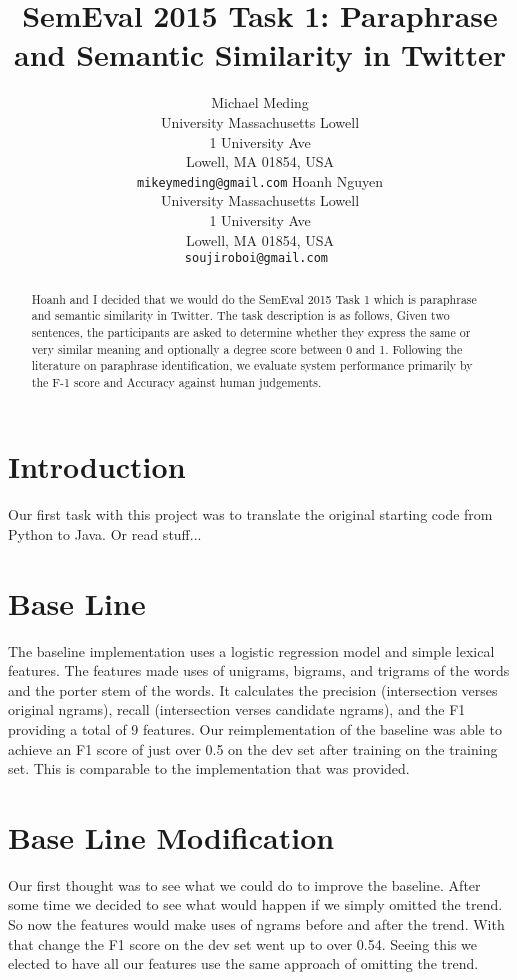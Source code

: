 \documentclass[11pt,letterpaper]{article}
\title{SemEval 2015 Task 1: Paraphrase and Semantic Similarity in Twitter}
\author{
	Michael Meding\\
  	University Massachusetts Lowell\\
	1 University Ave\\
	Lowell, MA 01854, USA\\
   {\tt mikeymeding@gmail.com}
	\And  
   Hoanh Nguyen\\
	University Massachusetts Lowell\\
	1 University Ave\\
	Lowell, MA 01854, USA\\
	{\tt soujiroboi@gmail.com }
}
\date{}
\begin{document}
\maketitle
\begin{abstract}
Hoanh and I decided that we would do the SemEval 2015 Task 1 which is paraphrase and semantic similarity in Twitter. The task description is as follows, Given two sentences, the participants are asked to determine whether they express the same or very similar meaning and optionally a degree score between 0 and 1. Following the literature on paraphrase identification, we evaluate system performance primarily by the F-1 score and Accuracy against human judgements. 
\end{abstract}

\section{Introduction}
\paragraph{} 
Our first task with this project was to translate the original starting code from Python to Java. Or read stuff...

\section{Base Line}
The baseline implementation uses a logistic regression model and simple lexical features. The features made uses of unigrams, bigrams, and trigrams of the words and the porter stem of the words. It calculates the precision (intersection verses original ngrams), recall (intersection verses candidate ngrams), and the F1 providing a total of 9 features. Our reimplementation of the baseline was able to achieve an F1 score of just over 0.5 on the dev set after training on the training set. This is comparable to the implementation that was provided.

\section{Base Line Modification}
Our first thought was to see what we could do to improve the baseline. After some time we decided to see what would happen if we simply omitted the trend. So now the features would make uses of ngrams before and after the trend. With that change the F1 score on the dev set went up to over 0.54. Seeing this we elected to have all our features use the same approach of omitting the trend.
\end{document}
